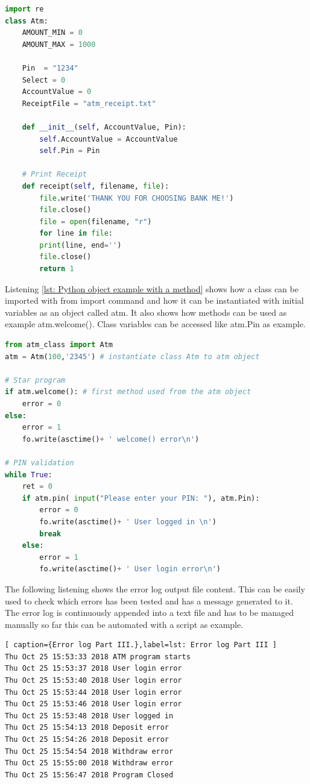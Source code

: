 \begin{lstlisting}[style=PythonStyle, language=Python, caption={Python class example with a method.},label=lst: Python class example with a method ]
import re
class Atm:
	AMOUNT_MIN = 0
	AMOUNT_MAX = 1000
	
	Pin  = "1234"
	Select = 0
	AccountValue = 0
	ReceiptFile = "atm_receipt.txt"
	
	def __init__(self, AccountValue, Pin):
		self.AccountValue = AccountValue
		self.Pin = Pin
	
	# Print Receipt
	def receipt(self, filename, file):
		file.write('THANK YOU FOR CHOOSING BANK ME!')
		file.close()
		file = open(filename, "r")
		for line in file:
		print(line, end='')
		file.close()
		return 1
\end{lstlisting}
Listening \ref{lst: Python object example with a method} shows how a class can be imported with from import command and how it can be instantiated with initial variables as an object called atm. It also shows how methods can be used as example atm.welcome(). Class variables can be accessed like atm.Pin as example.
\begin{lstlisting}[style=PythonStyle, language=Python, caption={Python object example with a method.},label=lst: Python object example with a method ]
from atm_class import Atm
atm = Atm(100,'2345') # instantiate class Atm to atm object

# Star program
if atm.welcome(): # first method used from the atm object
	error = 0 
else:
	error = 1
	fo.write(asctime()+ ' welcome() error\n')

# PIN validation
while True:
	ret = 0
	if atm.pin( input("Please enter your PIN: "), atm.Pin): 
		error = 0 
		fo.write(asctime()+ ' User logged in \n')
		break   
	else:
		error = 1
		fo.write(asctime()+ ' User login error\n')
\end{lstlisting}
The following listening shows the error log output file content. This can be easily used to check which errors has been tested and has a message generated to it. The error log is continuously appended into a text file and has to be managed manually so far this can be automated with a script as example. 
\begin{lstlisting}[ caption={Error log Part III.},label=lst: Error log Part III ]
Thu Oct 25 15:53:33 2018 ATM program starts 
Thu Oct 25 15:53:37 2018 User login error
Thu Oct 25 15:53:40 2018 User login error
Thu Oct 25 15:53:44 2018 User login error
Thu Oct 25 15:53:46 2018 User login error
Thu Oct 25 15:53:48 2018 User logged in 
Thu Oct 25 15:54:13 2018 Deposit error
Thu Oct 25 15:54:26 2018 Deposit error
Thu Oct 25 15:54:54 2018 Withdraw error
Thu Oct 25 15:55:00 2018 Withdraw error
Thu Oct 25 15:56:47 2018 Program Closed
\end{lstlisting}
